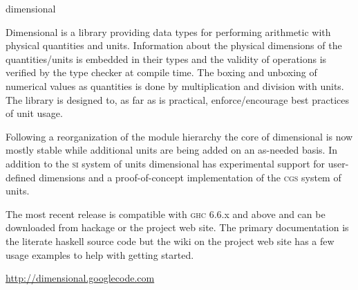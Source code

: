 \begin{hcarentry}{dimensional}
\label{dimensional}
\makeheader

Dimensional is a library providing data types for performing
arithmetic with physical quantities and units. Information about
the physical dimensions of the quantities/units is embedded in their
types and the validity of operations is verified by the type checker
at compile time. The boxing and unboxing of numerical values as
quantities is done by multiplication and division with units. The
library is designed to, as far as is practical, enforce/encourage
best practices of unit usage.

Following a reorganization of the module hierarchy the core of
dimensional is now mostly stable while additional units are being
added on an as-needed basis. In addition to the \textsc{si} system
of units dimensional has experimental support for user-defined
dimensions and a proof-of-concept implementation of the \textsc{cgs}
system of units.

The most recent release is compatible with \textsc{ghc} 6.6.x and
above and can be downloaded from hackage or the project web site.
The primary documentation is the literate haskell source code but
the wiki on the project web site has a few usage examples to help
with getting started.

\FurtherReading
 \url{http://dimensional.googlecode.com}
\end{hcarentry}

